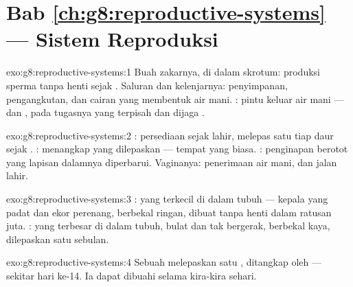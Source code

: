 \section*{Bab \ref{ch:g8:reproductive-systems} --- Sistem Reproduksi}

\begin{solution}{exo:g8:reproductive-systems:1}
Buah zakarnya, di dalam skrotum: produksi sperma tanpa henti
sejak . Saluran dan kelenjarnya: penyimpanan,
pengangkutan, dan cairan yang membentuk air mani. :
pintu keluar air mani --- dan , pada tugasnya yang
terpisah dan dijaga .
\end{solution}

\begin{solution}{exo:g8:reproductive-systems:2}
: persediaan  sejak lahir, melepas
satu tiap daur sejak . : menangkap
 yang dilepaskan --- tempat  yang biasa.
: penginapan berotot yang lapisan dalamnya
diperbarui. Vaginanya: penerimaan air mani, dan jalan lahir.
\end{solution}

\begin{solution}{exo:g8:reproductive-systems:3}
: yang terkecil di dalam tubuh --- kepala yang
padat  dan ekor perenang, berbekal ringan, dibuat
tanpa henti dalam ratusan juta. : yang terbesar di
dalam tubuh, bulat dan tak bergerak, berbekal kaya,
dilepaskan satu sebulan.
\end{solution}

\begin{solution}{exo:g8:reproductive-systems:4}
Sebuah  melepaskan satu , ditangkap
oleh  --- sekitar hari ke-14. Ia dapat
dibuahi selama kira-kira sehari.
\end{solution}

